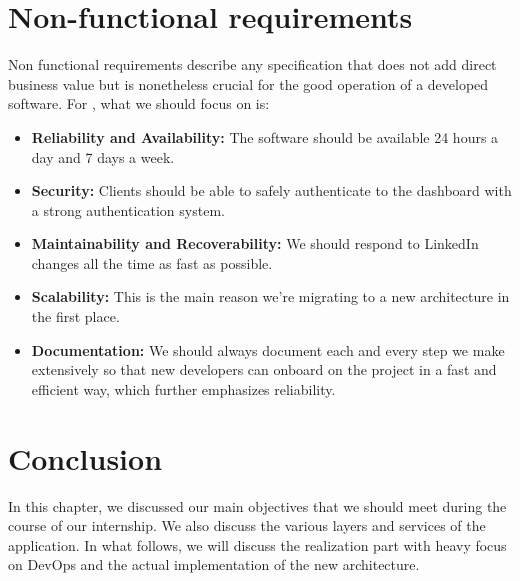 \section{Non-functional requirements}
Non functional requirements describe any specification that does not add direct business value but is nonetheless crucial for the good operation of a developed software.
For , what we should focus on is:
\begin{itemize}
	\item \textbf{Reliability and Availability:} The software should be available 24 hours a day and 7 days a week.
	\item \textbf{Security:} Clients should be able to safely authenticate to the dashboard with a strong authentication system.
	\item \textbf{Maintainability and Recoverability:} We should respond to LinkedIn changes all the time as fast as possible.
	\item \textbf{Scalability:} This is the main reason we're migrating to a new architecture in the first place.
	\item \textbf{Documentation:} We should always document each and every step we make extensively so that new developers can onboard on the project in a fast and efficient way, which further emphasizes reliability.
\end{itemize}

\setcounter{secnumdepth}{0} %
\section{Conclusion}
In this chapter, we discussed our main objectives that we should meet during the course of our internship.
We also discuss the various layers and services of the application.
In what follows, we will discuss the realization part with heavy focus on DevOps and the actual implementation of the new architecture.
